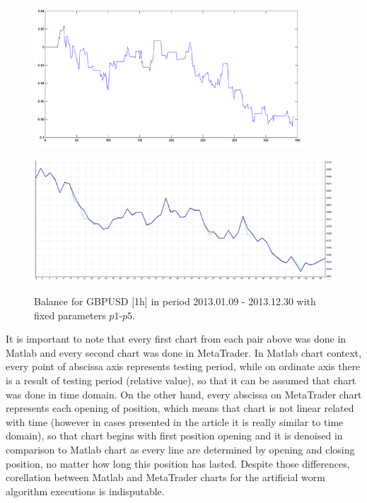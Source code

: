 \documentclass[runningheads,a4paper]{llncs}
\begin{document}
\begin{figure}[h!]
\begin{minipage}{0.49\textwidth}
\centering
\includegraphics[width = 0.9\textwidth]{figures/rys12.png}
\label{fig:fig12}
\end{minipage}
\begin{minipage}{0.49\textwidth}
\centering
\includegraphics[width = \textwidth]{figures/rys13.png}
\label{fig:fig13}
\end{minipage}
\caption{Balance for GBPUSD [1h] in period 2013.01.09 - 2013.12.30 with fixed parameters $p1$-$p5$.}
\end{figure}
\FloatBarrier

It is important to note that every first chart from each pair above was done in Matlab and every second chart was done in MetaTrader. In Matlab chart context, every point of abscissa axis represents testing period, while on ordinate axis there is a result of testing period (relative value), so that it can be assumed that chart was done in time domain. On the other hand, every abscissa on MetaTrader chart represents each opening of position, which means that chart is not linear related with time (however in cases presented in the article it is really similar to time domain), so that chart begins with first position opening and it is denoised in comparison to Matlab chart as every line are determined by opening and closing position, no matter how long this position has lasted. Despite those differences, corellation between Matlab and MetaTrader charts for the artificial worm algorithm executions is indisputable.
\end{document}

